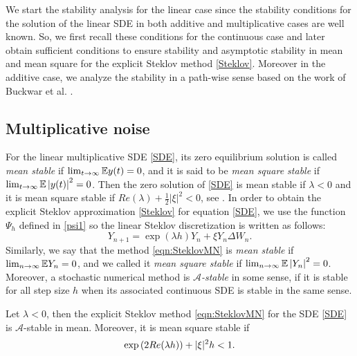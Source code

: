 	We start the stability analysis for the linear case since the 
stability conditions
for the solution of the linear SDE in both additive and multiplicative cases are well
known. So,  we first recall these conditions for the continuous case and later obtain
sufficient conditions to ensure stability  and asymptotic stability in mean and mean
square for the explicit Steklov method \eqref{Steklov}. Moreover in the additive case,
we analyze the stability in a path-wise sense based on the work of Buckwar et al.
\cite{Buckwar2011a}.
\subsection{Multiplicative noise}
		For the linear multiplicative SDE \eqref{SDE},  its zero equilibrium solution is
	called {\it mean stable} if $\lim_{t\to\infty}\m y(t)=0$, and it is said to be {\it
	mean square stable} if  $\lim_{t\to\infty}\ms{y(t)}=0$. Then the zero solution of
	\eqref{SDE} is mean stable if $\lambda<0$ and it is    mean square stable if
	$Re(\lambda)+\frac{1}{2} |\xi|^2 <0$, see \cite{Higham2000}. In order to obtain the
	explicit Steklov approximation \eqref{Steklov} for equation \eqref{SDE}, we use the
	function $\Psi_h$  defined in \eqref{psi1} so the linear Steklov discretization is
	written as follows:
	\begin{equation}\label{eqn:SteklovMN}
		Y_{n+1}=\exp(\lambda h)Y_n+\xi Y_n \Delta W_n.
	\end{equation}
	Similarly, we say that the method \eqref{eqn:SteklovMN} is {\it mean stable} if
	$\lim_{n\to\infty} \m Y_n=0$, and we called it {\it mean square stable} if
	$\lim_{n\to\infty}\ms{Y_{n}}=0$. Moreover, a stochastic numerical method is    {\it
	$\mathcal{A}$-stable} in some sense, if it is stable for all step size $h$ when its
	associated continuous SDE is stable in the same sense.
	\begin{pro}
		Let $\lambda<0$, then the explicit Steklov method \eqref{eqn:SteklovMN} for the
		SDE \eqref{SDE} is  $\mathcal{A}$-stable in mean. Moreover, it is mean square
		stable if 
		\begin{equation}\label{c2}
			\exp \lftrght{2Re(\lambda h)}{(}{)}
			+|\xi|^2 h<1.
	\end{equation}
	\end{pro}
